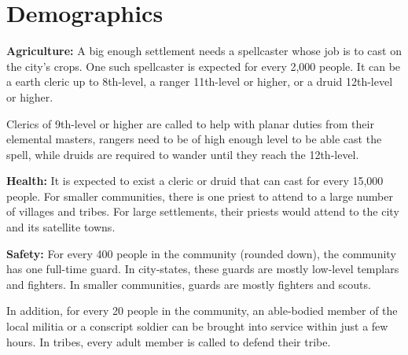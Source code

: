 \section{Demographics}




\textbf{Agriculture:} A big enough settlement needs a spellcaster whose job is to cast  on the city's crops. One such spellcaster is expected for every 2,000 people. It can be a earth cleric up to 8th-level, a ranger 11th-level or higher, or a druid 12th-level or higher.

Clerics of 9th-level or higher are called to help with planar duties from their elemental masters, rangers need to be of high enough level to be able cast the spell, while druids are required to wander until they reach the 12th-level.

\textbf{Health:} It is expected to exist a cleric or druid that can cast  for every 15,000 people. For smaller communities, there is one priest to attend to a large number of villages and tribes. For large settlements, their priests would attend to the city and its satellite towns.

\textbf{Safety:} For every 400 people in the community (rounded down), the community has one full-time guard. In city-states, these guards are mostly low-level templars and fighters. In smaller communities, guards are mostly fighters and scouts.

In addition, for every 20 people in the community, an able-bodied member of the local militia or a conscript soldier can be brought into service within just a few hours. In tribes, every adult member is called to defend their tribe. 

